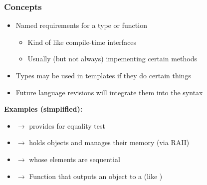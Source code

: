 \documentclass[glossy]{beamer}
\begin{document}

\begin{frame}[fragile=singleslide]
  \frametitle{Concepts}

  \begin{itemize}
    \item Named requirements for a type or function
    \begin{itemize}
      \item Kind of like compile-time interfaces
      \item Usually (but not always) impementing certain methods
    \end{itemize}
    \item Types may be used in templates if they do certain things
    \item Future language revisions will integrate them into the syntax
  \end{itemize}

  \textbf{Examples (simplified):}
  \begin{itemize}
    \item {} $\rightarrow$ provides  for equality test
    \item {} $\rightarrow$ holds objects and manages their memory (via RAII)
    \item {} $\rightarrow$  whose elements are sequential
    \item {} $\rightarrow$ Function that outputs an object to a  (like )
  \end{itemize}
\end{frame}

\end{document}
